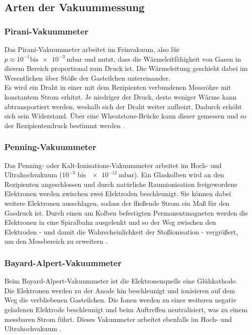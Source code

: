\subsection{Arten der Vakuummessung}

\subsubsection{Pirani-Vakuummeter}

Das Pirani-Vakuummeter arbeitet im Feinvakuum, also für $p\approx 10^{-1} \text{bis} \SI{e-3}{\milli\bar}$ und nutzt, dass die Wärmeleitfähigkeit von Gasen in diesem Bereich proportional zum Druck ist. Die Wärmeleitung geschieht dabei im Wesentlichen über Stöße der Gasteilchen untereinander.\\
Es wird ein Draht in einer mit dem Rezipienten verbundenen Messröhre mit konstantem Strom erhitzt. Je niedriger der Druck, desto weniger Wärme kann abtransportiert werden, weshalb sich der Draht weiter aufheizt. Dadurch erhöht sich sein Widerstand. Über eine Wheatstone-Brücke kann dieser gemessen und so der Rezipientendruck bestimmt werden \cite{Jena}.

\subsubsection{Penning-Vakuummeter}

Das Penning- oder Kalt-Ionisations-Vakuummeter arbeitet im Hoch- und Ultrahochvakuum ($10^{-3} \text{ bis } \SI{e-12}{\milli\bar}$). Ein Glaskolben wird an den Rezipienten angeschlossen und durch natürliche Raumionisation freigewordene Elektronen werden zwischen zwei Elektroden beschleunigt. Sie können dabei weitere Elektronen ausschlagen, sodass der fließende Strom ein Maß für den Gasdruck ist. Durch einen am Kolben befestigten Permanentmagneten werden die Elektronen in eine Spiralbahn ausgelenkt und so der Weg zwischen den Elektroden - und damit die Wahrscheinlichkeit der Stoßionisation - vergrößert, um den Messbereich zu erweitern \cite{Jena}.

\subsubsection{Bayard-Alpert-Vakuummeter}

Beim Bayard-Alpert-Vakuummeter ist die Elektronenquelle eine Glühkathode. Die Elektronen werden zu der Anode hin beschleunigt und ionisieren auf dem Weg die verbliebenen Gasteilchen. Die Ionen werden zu einer weiteren negativ geladenen Elektrode beschleunigt und beim Auftreffen neutralisiert, was zu einem messbaren Strom führt. Dieses Vakummeter arbeitet ebenfalls im Hoch- und Ultrahochvakuum \cite{Spektrum}.
